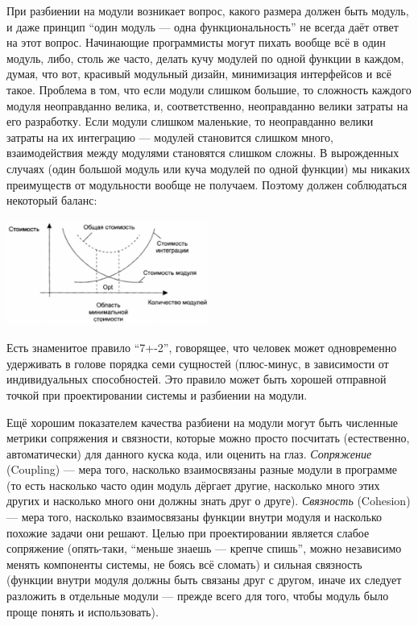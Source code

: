 \documentclass[a5paper]{article}
\begin{document}
При разбиении на модули возникает вопрос, какого размера должен быть модуль, и даже принцип ``один модуль --- одна функциональность'' не всегда даёт ответ на этот вопрос. Начинающие программисты могут пихать вообще всё в один модуль, либо, столь же часто, делать кучу модулей по одной функции в каждом, думая, что вот, красивый модульный дизайн, минимизация интерфейсов и всё такое. Проблема в том, что если модули слишком большие, то сложность каждого модуля неоправданно велика, и, соответственно, неоправданно велики затраты на его разработку. Если модули слишком маленькие, то неоправданно велики затраты на их интеграцию --- модулей становится слишком много, взаимодействия между модулями становятся слишком сложны. В вырожденных случаях (один большой модуль или куча модулей по одной функции) мы никаких преимуществ от модульности вообще не получаем. Поэтому должен соблюдаться некоторый баланс:

\begin{center}
	\includegraphics[width=0.5\textwidth]{modulesCost.png}
\end{center}

Есть знаменитое правило ``7+-2'', говорящее, что человек может одновременно удерживать в голове порядка семи сущностей (плюс-минус, в зависимости от индивидуальных способностей. Это правило может быть хорошей отправной точкой при проектировании системы и разбиении на модули.

Ещё хорошим показателем качества разбиени на модули могут быть численные метрики сопряжения и связности, которые можно просто посчитать (естественно, автоматически) для данного куска кода, или оценить на глаз. \textit{Сопряжение} (Coupling) --- мера того, насколько взаимосвязаны разные модули в программе (то есть насколько часто один модуль дёргает другие, насколько много этих других и насколько много они должны знать друг о друге). \textit{Связность} (Cohesion) --- мера того, насколько взаимосвязаны функции внутри модуля и насколько похожие задачи они решают. Целью при проектировании является слабое сопряжение (опять-таки, ``меньше знаешь --- крепче спишь'', можно независимо менять компоненты системы, не боясь всё сломать) и сильная связность (функции внутри модуля должны быть связаны друг с другом, иначе их следует разложить в отдельные модули --- прежде всего для того, чтобы модуль было проще понять и использовать).
\end{document}
